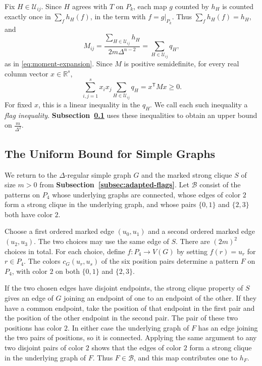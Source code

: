 \documentclass[preprint,11pt,numbers]{elsarticle-arxiv}
\numberwithin{equation}{section}
\theoremstyle{definition}
\begin{document}
Fix $H\in\mathcal U_{ij}$. Since $H$ agrees with $T$ on $P_k$, each
map $g$ counted by $h_H$ is counted exactly once in $\sum_f h_H(f)$,
in the term with $f=g|_{P_k}$. Thus $\sum_f h_H(f)=h_H$, and
\[
 M_{ij}
 =\frac{\displaystyle\sum_{H\in\mathcal U_{ij}}h_H}
        {2m\Delta^{n-2}}
 =\sum_{H\in\mathcal U_{ij}}q_H,
\]
as in \eqref{eq:moment-expansion}. Since $M$ is positive
semidefinite, for every real column vector $x\in\mathbb R^s$,
\[
 \sum_{i,j=1}^{s}x_i x_j\sum_{H\in\mathcal U_{ij}}q_H
 =x^{\mathsf T}Mx\geq 0.
\]
For fixed $x$, this is a linear inequality in the $q_H$.
We call each such inequality a \emph{flag inequality}.
\textbf{Subsection~\ref{subsec:marked-edge-pairs}} uses these
inequalities to obtain an upper bound on $\frac{m}{\Delta^2}$.

\subsection{The Uniform Bound for Simple Graphs}\label{subsec:marked-edge-pairs}

We return to the $\Delta$-regular simple graph $G$ and the marked
strong clique $S$ of size $m>0$ from
\textbf{Subsection~\ref{subsec:adapted-flags}}. Let $\mathcal B$
consist of the patterns on $P_4$ whose underlying graphs are
connected, whose edges of color $2$ form a strong clique in the
underlying graph, and whose pairs $\{0,1\}$ and $\{2,3\}$ both
have color $2$.

Choose a first ordered marked edge $(u_0,u_1)$ and a second ordered
marked edge $(u_2,u_3)$. The two choices may use the same edge of
$S$. There are $(2m)^2$ choices in total. For each choice, define
$f\colon P_4\to V(G)$ by setting $f(r)=u_r$ for $r\in P_4$. The colors
$c_G(u_r,u_s)$ of the six position pairs determine a pattern $F$
on $P_4$, with color $2$ on both $\{0,1\}$ and $\{2,3\}$.

If the two chosen edges have disjoint endpoints, the strong clique
property of $S$ gives an edge of $G$ joining an endpoint of one to
an endpoint of the other. If they have a common endpoint, take
the position of that endpoint in the first pair and the position
of the other endpoint in the second pair. The pair of these two
positions has color $2$. In either case the underlying graph of
$F$ has an edge joining the two pairs of positions, so it is
connected. Applying the same argument to any two disjoint pairs
of color $2$ shows that the edges of color $2$ form a strong clique
in the underlying graph of $F$. Thus $F\in\mathcal B$, and this
map contributes one to $h_F$.
\end{document}
